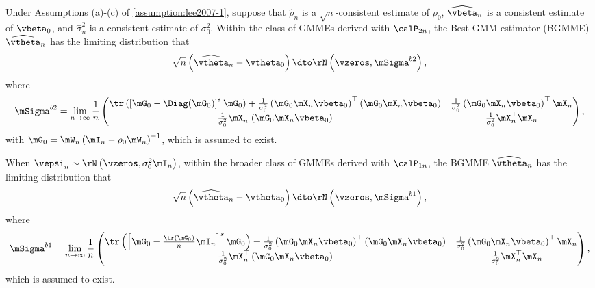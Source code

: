 \documentclass[english,12pt]{book}\usepackage[]{graphicx}\usepackage[]{xcolor}
\begin{document}
\begin{theorem}
Under Assumptions (a)-(c) of \ref{assumption:lee2007-1}, suppose that $\widehat{\rho}_n$ is a $\sqrt{n}$-consistent estimate of $\rho_0$, $\widehat{\vbeta}_n$ is a consistent estimate of $\vbeta_0$, and $\widehat{\sigma}_n^2$ is a consistent estimate of $\sigma_0^2$. Within the class of GMMEs derived with $\calP_{2n}$, the Best GMM estimator (BGMME) $\widehat{\vtheta}_n$ has the limiting distribution that
\begin{equation*}
  \sqrt{n}\left(\widehat{\vtheta}_n - \vtheta_0\right)\dto \rN\left(\vzeros, \mSigma^{b2}\right), 
\end{equation*}
%
where
\begin{equation*}
  \mSigma^{b2} = \lim_{n\to\infty}\frac{1}{n}
  \begin{pmatrix}
    \tr\left(\left[\mG_0 - \Diag(\mG_0)\right]^s \mG_0\right) + \frac{1}{\sigma_0^2}\left(\mG_0\mX_n\vbeta_0\right)^\top\left(\mG_0\mX_n\vbeta_0\right) & \frac{1}{\sigma_0^2}\left(\mG_0\mX_n\vbeta_0\right)^\top\mX_n \\
    \frac{1}{\sigma_0^2}\mX_n^\top\left(\mG_0\mX_n\vbeta_0\right) & \frac{1}{\sigma_0^2}\mX_n^\top\mX_n
  \end{pmatrix},
\end{equation*}
%
with $\mG_0 = \mW_n\left(\mI_n - \rho_0\mW_n\right)^{-1}$, which is assumed to exist.

When $\vepsi_n\sim\rN\left(\vzeros, \sigma_0^2\mI_n\right)$, within the broader class of GMMEs derived with $\calP_{1n}$, the BGMME $\widehat{\vtheta}_{n}$ has the limiting distribution that
\begin{equation*}
  \sqrt{n}\left(\widehat{\vtheta}_n - \vtheta_0\right)\dto \rN\left(\vzeros, \mSigma^{b1}\right), 
\end{equation*}
%
where
\begin{equation*}
  \mSigma^{b1} = \lim_{n\to\infty}\frac{1}{n}
  \begin{pmatrix}
    \tr\left(\left[\mG_0 - \frac{\tr(\mG_0)}{n}\mI_n\right]^s \mG_0\right) + \frac{1}{\sigma_0^2}\left(\mG_0\mX_n\vbeta_0\right)^\top\left(\mG_0\mX_n\vbeta_0\right) & \frac{1}{\sigma_0^2}\left(\mG_0\mX_n\vbeta_0\right)^\top\mX_n \\
    \frac{1}{\sigma_0^2}\mX_n^\top\left(\mG_0\mX_n\vbeta_0\right) & \frac{1}{\sigma_0^2}\mX_n^\top\mX_n
  \end{pmatrix},
\end{equation*}
%
which is assumed to exist.
\end{theorem}
\end{document}
